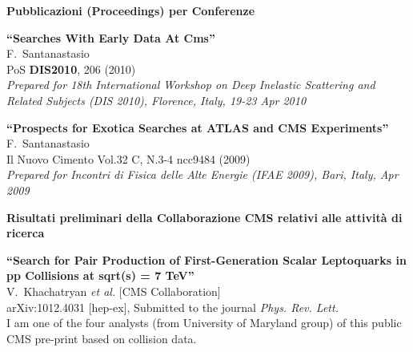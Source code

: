 \documentclass[10pt, a4paper]{article}
\begin{document}
\begin{thebibliography}{599}
\vspace{0.1cm} \begin{center} \textbf{Pubblicazioni (Proceedings) per Conferenze} \end{center} \vspace{0.05cm}

{\bf ``Searches With Early Data At Cms''}
  \\{}F.~Santanastasio
  \\{}PoS {\bf DIS2010}, 206 (2010)
\\{}{\it Prepared for 18th International Workshop on Deep Inelastic Scattering and Related Subjects (DIS 2010), Florence, Italy, 19-23 Apr 2010}

{\bf ``Prospects for Exotica Searches at ATLAS and CMS Experiments''}
  \\{}F.~Santanastasio
  \\{}Il Nuovo Cimento Vol.32 C, N.3-4 ncc9484 (2009)
\\{}{\it Prepared for Incontri di Fisica delle Alte Energie (IFAE 2009), Bari, Italy, Apr 2009}

\vspace{0.1cm} \begin{center} \textbf{Risultati preliminari della Collaborazione CMS relativi alle attivit\`a di ricerca} \end{center} \vspace{0.05cm}

{\bf ``Search for Pair Production of First-Generation Scalar Leptoquarks in pp Collisions at sqrt(s) = 7 TeV''}
  \\{}V.~Khachatryan {\it et al.}  [CMS Collaboration]
  \\{}arXiv:1012.4031 [hep-ex], Submitted to the journal {\it Phys. Rev. Lett.}
  \\I am one of the four analysts (from University of Maryland group) of this public CMS pre-print based on collision data.


\end{thebibliography}
\end{document}

